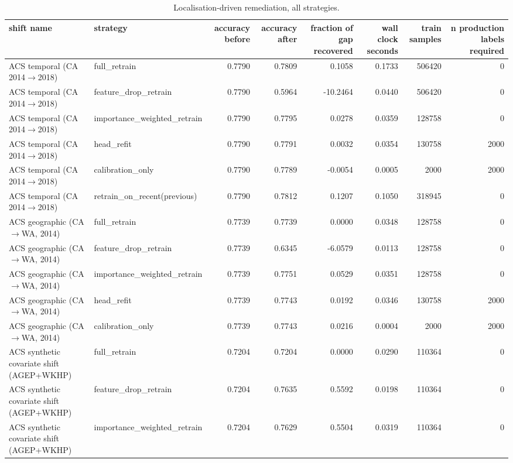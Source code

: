 \begin{table}[!htbp]
\centering
\caption{Localisation-driven remediation, all strategies.}
\label{tab:remediation-full}
\renewcommand{\arraystretch}{1.15}\setlength{\tabcolsep}{3pt}\footnotesize
\begin{tabular}{@{}l l r r r r r r @{}}
\toprule
shift name & strategy & accuracy before & accuracy after & fraction of gap recovered & wall clock seconds & train samples & n production labels required \\
\midrule
ACS temporal (CA 2014$\rightarrow$2018) & full\_retrain & 0.7790 & 0.7809 & 0.1058 & 0.1733 & 506420 & 0 \\
ACS temporal (CA 2014$\rightarrow$2018) & feature\_drop\_retrain & 0.7790 & 0.5964 & -10.2464 & 0.0440 & 506420 & 0 \\
ACS temporal (CA 2014$\rightarrow$2018) & importance\_weighted\_retrain & 0.7790 & 0.7795 & 0.0278 & 0.0359 & 128758 & 0 \\
ACS temporal (CA 2014$\rightarrow$2018) & head\_refit & 0.7790 & 0.7791 & 0.0032 & 0.0354 & 130758 & 2000 \\
ACS temporal (CA 2014$\rightarrow$2018) & calibration\_only & 0.7790 & 0.7789 & -0.0054 & 0.0005 & 2000 & 2000 \\
ACS temporal (CA 2014$\rightarrow$2018) & retrain\_on\_recent(previous) & 0.7790 & 0.7812 & 0.1207 & 0.1050 & 318945 & 0 \\
ACS geographic (CA$\rightarrow$WA, 2014) & full\_retrain & 0.7739 & 0.7739 & 0.0000 & 0.0348 & 128758 & 0 \\
ACS geographic (CA$\rightarrow$WA, 2014) & feature\_drop\_retrain & 0.7739 & 0.6345 & -6.0579 & 0.0113 & 128758 & 0 \\
ACS geographic (CA$\rightarrow$WA, 2014) & importance\_weighted\_retrain & 0.7739 & 0.7751 & 0.0529 & 0.0351 & 128758 & 0 \\
ACS geographic (CA$\rightarrow$WA, 2014) & head\_refit & 0.7739 & 0.7743 & 0.0192 & 0.0346 & 130758 & 2000 \\
ACS geographic (CA$\rightarrow$WA, 2014) & calibration\_only & 0.7739 & 0.7743 & 0.0216 & 0.0004 & 2000 & 2000 \\
ACS synthetic covariate shift (AGEP+WKHP) & full\_retrain & 0.7204 & 0.7204 & 0.0000 & 0.0290 & 110364 & 0 \\
ACS synthetic covariate shift (AGEP+WKHP) & feature\_drop\_retrain & 0.7204 & 0.7635 & 0.5592 & 0.0198 & 110364 & 0 \\
ACS synthetic covariate shift (AGEP+WKHP) & importance\_weighted\_retrain & 0.7204 & 0.7629 & 0.5504 & 0.0319 & 110364 & 0 \\

\end{tabular}
\end{table}
